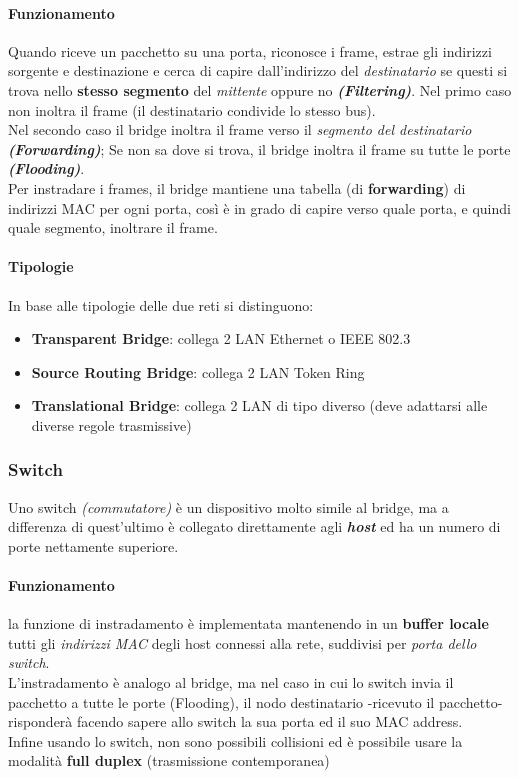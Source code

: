 \documentclass[a4paper,11pt]{article}
\def\subsub#1{\subsubsection{#1}\label{#1}}
\def\para#1{\paragraph{#1}\label{#1}}
\begin{document}
\paragraph{Funzionamento} Quando riceve un pacchetto su una porta, riconosce i frame, estrae gli indirizzi sorgente e destinazione e cerca di capire dall'indirizzo del \textit{destinatario} se questi si trova nello \textbf{stesso segmento} del \textit{mittente} oppure no \textbf{\textit{(Filtering)}}. Nel primo caso non inoltra il frame (il destinatario condivide lo stesso bus). \\Nel secondo caso il bridge inoltra il frame verso il \textit{segmento del destinatario} \textbf{\textit{(Forwarding)}}; Se non sa dove si trova, il bridge inoltra il frame su tutte le porte \textbf{\textit{(Flooding)}}. \\Per instradare i frames, il bridge mantiene una tabella (di \textbf{forwarding}) di indirizzi MAC per ogni porta, così è in grado di capire verso quale porta, e quindi quale segmento, inoltrare il frame. 
\para{Tipologie} In base alle tipologie delle due reti si distinguono:
\begin{itemize}
\item \textbf{Transparent Bridge}: collega 2 LAN Ethernet o IEEE 802.3
\item \textbf{Source Routing Bridge}: collega 2 LAN Token Ring
\item \textbf{Translational Bridge}: collega 2 LAN di tipo diverso (deve adattarsi alle diverse regole trasmissive)
\end{itemize}

\subsub{Switch} Uno switch \textit{(commutatore)} è un dispositivo molto simile al bridge, ma a differenza di quest'ultimo è collegato direttamente agli \textbf{\textit{host}} ed ha un numero di porte nettamente superiore.
\paragraph{Funzionamento} la funzione di instradamento è implementata mantenendo in un \textbf{buffer locale} tutti gli \textit{indirizzi MAC} degli host connessi alla rete, suddivisi per \textit{porta dello switch}.\\
L'instradamento è analogo al bridge, ma nel caso in cui lo switch invia il pacchetto a tutte le porte (Flooding), il nodo destinatario -ricevuto il pacchetto- risponderà facendo sapere allo switch la sua porta ed il suo MAC address.\\
Infine usando lo switch, non sono possibili collisioni ed è possibile usare la modalità \textbf{full duplex} (trasmissione contemporanea)
\end{document}
